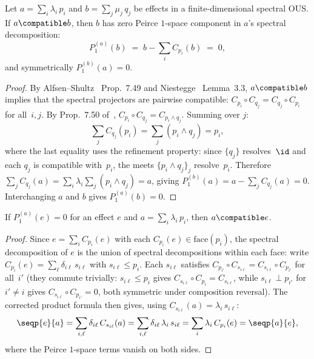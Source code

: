 \begin{lemma}\label{lem:peirce-vanish}
Let $a = \sum_i \lambda_i\, p_i$ and $b = \sum_j \mu_j\, q_j$ be effects
in a finite-dimensional spectral OUS.  If $a \compatible b$, then
$b$ has zero Peirce $1$-space component in $a$'s spectral decomposition:
\begin{equation}\label{eq:peirce-vanish}
  P_1^{(a)}(b) \;=\; b - \sum_i C_{p_i}(b) \;=\; 0,
\end{equation}
and symmetrically $P_1^{(b)}(a) = 0$.
\end{lemma}

\begin{proof}
By Alfsen--Shultz~\cite{AlfsenShultz2003} Prop.~7.49 and
Niestegge~\cite{Niestegge2009} Lemma~3.3, $a \compatible b$ implies that
the spectral projectors are pairwise compatible:
$C_{p_i} \circ C_{q_j} = C_{q_j} \circ C_{p_i}$ for all~$i,j$.
By Prop.~7.50 of~\cite{AlfsenShultz2003},
$C_{p_i} \circ C_{q_j} = C_{p_i \wedge q_j}$.  Summing over $j$:
\[
  \sum_j C_{q_j}(p_i)
  = \sum_j (p_i \wedge q_j)
  = p_i,
\]
where the last equality uses the refinement property: since $\{q_j\}$
resolves~$\id$ and each $q_j$ is compatible with~$p_i$, the
meets $\{p_i \wedge q_j\}_j$ resolve~$p_i$.  Therefore
$\sum_j C_{q_j}(a) = \sum_i \lambda_i \sum_j (p_i \wedge q_j) = a$,
giving $P_1^{(b)}(a) = a - \sum_j C_{q_j}(a) = 0$.  Interchanging $a$
and $b$ gives $P_1^{(a)}(b) = 0$.
\end{proof}

\begin{proposition}\label{prop:block-compat}
If $P_1^{(a)}(e) = 0$ for an effect $e$ and $a = \sum_i \lambda_i\, p_i$,
then $a \compatible e$.
\end{proposition}

\begin{proof}
Since $e = \sum_i C_{p_i}(e)$ with each $C_{p_i}(e) \in
\mathrm{face}(p_i)$, the spectral decomposition of $e$ is the union of
spectral decompositions within each face: write
$C_{p_i}(e) = \sum_\ell \delta_{i\ell}\, s_{i\ell}$ with
$s_{i\ell} \le p_i$.  Each $s_{i\ell}$ satisfies
$C_{p_{i'}} \circ C_{s_{i\ell}} = C_{s_{i\ell}} \circ C_{p_{i'}}$ for
all~$i'$ (they commute trivially: $s_{i\ell} \le p_i$ gives
$C_{s_{i\ell}} \circ C_{p_i} = C_{s_{i\ell}}$, while
$s_{i\ell} \perp p_{i'}$ for $i' \ne i$ gives
$C_{s_{i\ell}} \circ C_{p_{i'}} = 0$, both symmetric under composition
reversal).  The corrected product formula then gives, using
$C_{s_{i\ell}}(a) = \lambda_i\, s_{i\ell}$:
\[
  \seqp{e}{a}
  = \sum_{i,\ell} \delta_{i\ell}\, C_{s_{i\ell}}(a)
  = \sum_{i,\ell} \delta_{i\ell}\, \lambda_i\, s_{i\ell}
  = \sum_i \lambda_i\, C_{p_i}(e)
  = \seqp{a}{e},
\]
where the Peirce $1$-space terms vanish on both sides.
\end{proof}

